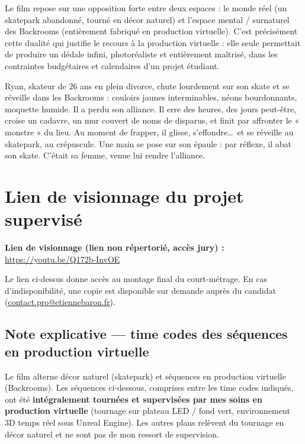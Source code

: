 \documentclass[11pt,a4paper]{report}
\begin{document}
Le film repose sur une opposition forte entre deux espaces : le monde réel (un skatepark abandonné, tourné en décor naturel) et l'espace mental / surnaturel des Backrooms (entièrement fabriqué en production virtuelle). C'est précisément cette dualité qui justifie le recours à la production virtuelle : elle seule permettait de produire un dédale infini, photoréaliste et entièrement maîtrisé, dans les contraintes budgétaires et calendaires d'un projet étudiant.

\begin{notebox}[title={Synopsis condensé}]
Ryan, skateur de 26 ans en plein divorce, chute lourdement sur son skate et se réveille dans les Backrooms : couloirs jaunes interminables, néons bourdonnants, moquette humide. Il a perdu son alliance. Il erre des heures, des jours peut-être, croise un cadavre, un mur couvert de noms de disparus, et finit par affronter le « monstre » du lieu. Au moment de frapper, il glisse, s'effondre\ldots\ et se réveille au skatepark, au crépuscule. Une main se pose sur son épaule : par réflexe, il abat son skate. C'était sa femme, venue lui rendre l'alliance.
\end{notebox}

\section{Lien de visionnage du projet supervisé}
\begin{techbox}[title={Accès au film}]
\textbf{Lien de visionnage (lien non répertorié, accès jury) :}\\
\url{https://youtu.be/Q172b-InvOE}

\medskip
\footnotesize Le lien ci-dessus donne accès au montage final du court-métrage. En cas d'indisponibilité, une copie est disponible sur demande auprès du candidat (\href{mailto:contact.pro@etiennebaron.fr}{contact.pro@etiennebaron.fr}).
\end{techbox}

\subsection{Note explicative --- time codes des séquences en production virtuelle}
Le film alterne décor naturel (skatepark) et séquences en production virtuelle (Backrooms). Les séquences ci-dessous, comprises entre les time codes indiqués, ont été \textbf{intégralement tournées et supervisées par mes soins en production virtuelle} (tournage sur plateau LED / fond vert, environnement 3D temps réel sous Unreal Engine). Les autres plans relèvent du tournage en décor naturel et ne sont pas de mon ressort de supervision.
\end{document}
